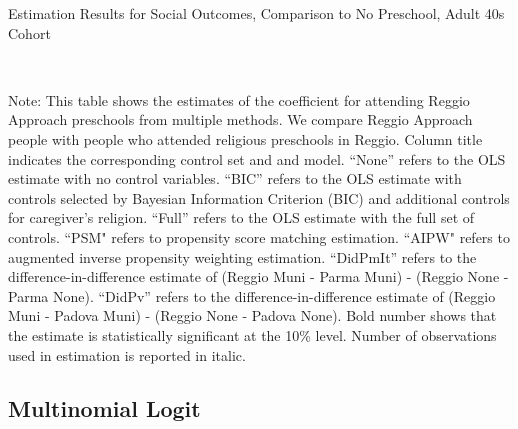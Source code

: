 \begin{table}[H] \caption{Estimation Results for Social Outcomes, Comparison to No Preschool, Adult 40s Cohort} \label{ols-S-adult40-reg-none}
\scalebox{0.8}{}
\vspace{1ex} \\
\footnotesize\raggedright{Note: This table shows the estimates of the coefficient for attending Reggio Approach preschools from multiple methods. We compare Reggio Approach people with people who attended religious preschools in Reggio. Column title indicates the corresponding control set and and model. ``None'' refers to the OLS estimate with no control variables. ``BIC'' refers to the OLS estimate with controls selected by Bayesian Information Criterion (BIC) and additional controls for caregiver's religion. ``Full'' refers to the OLS estimate with the full set of controls. ``PSM" refers to propensity score matching estimation. ``AIPW" refers to augmented inverse propensity weighting estimation. ``DidPmIt'' refers to the difference-in-difference estimate of (Reggio Muni - Parma Muni) - (Reggio None - Parma None). ``DidPv'' refers to the difference-in-difference estimate of (Reggio Muni - Padova Muni) - (Reggio None - Padova None). Bold number shows that the estimate is statistically significant at the 10\% level. Number of observations used in estimation is reported in italic.}
\end{table}



















\subsection{Multinomial Logit}\label{appendix:mlogit}

